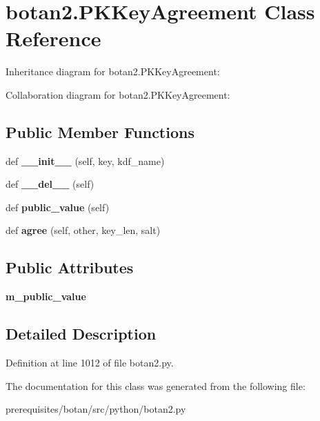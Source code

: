 \hypertarget{classbotan2_1_1_p_k_key_agreement}{}\section{botan2.\+P\+K\+Key\+Agreement Class Reference}
\label{classbotan2_1_1_p_k_key_agreement}


Inheritance diagram for botan2.\+P\+K\+Key\+Agreement\+:


Collaboration diagram for botan2.\+P\+K\+Key\+Agreement\+:
\subsection*{Public Member Functions}
\begin{DoxyCompactItemize}
\item 
\mbox{\label{classbotan2_1_1_p_k_key_agreement_a657a1fdb9799744b5015968874bbe52b}} 
def {\bfseries \+\_\+\+\_\+init\+\_\+\+\_\+} (self, key, kdf\+\_\+name)
\item 
\mbox{\label{classbotan2_1_1_p_k_key_agreement_a96ad1bc1156bd4963a3085faee95bdba}} 
def {\bfseries \+\_\+\+\_\+del\+\_\+\+\_\+} (self)
\item 
\mbox{\label{classbotan2_1_1_p_k_key_agreement_ab4e5be371861bfa908aec69fb93edf7a}} 
def {\bfseries public\+\_\+value} (self)
\item 
\mbox{\label{classbotan2_1_1_p_k_key_agreement_a9c72704aab922b887a2e86a65ec73012}} 
def {\bfseries agree} (self, other, key\+\_\+len, salt)
\end{DoxyCompactItemize}
\subsection*{Public Attributes}
\begin{DoxyCompactItemize}
\item 
\mbox{\label{classbotan2_1_1_p_k_key_agreement_a60fd6bd89a7d270de9330faa24d7ad5f}} 
{\bfseries m\+\_\+public\+\_\+value}
\end{DoxyCompactItemize}


\subsection{Detailed Description}


Definition at line 1012 of file botan2.\+py.



The documentation for this class was generated from the following file\+:\begin{DoxyCompactItemize}
\item 
prerequisites/botan/src/python/botan2.\+py\end{DoxyCompactItemize}
